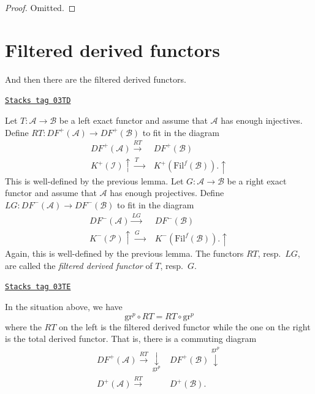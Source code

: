 \begin{proof}
Omitted.
\end{proof}

\section{Filtered derived functors}
\label{trace-section-filtered-derived-functors}
And then there are the filtered derived functors.

\begin{definition}
\label{trace-definition-filtered-derived-functors}
\href{https://stacks.math.columbia.edu/tag/03TD}{\texttt{Stacks tag 03TD}}

Let $T: \mathcal{A} \to \mathcal{B}$ be a left exact functor and assume that
$\mathcal{A}$ has enough injectives. Define $RT: DF^+(\mathcal{A}) \to D
F^+(\mathcal{B})$ to fit in the diagram
$$
\begin{array}{cc}DF^+(\mathcal{A}) \overset{RT}{\longrightarrow} & DF^+(\mathcal{B}) \\ K^+(\mathcal{I}) \uparrow\overset{T \quad}{\longrightarrow} & K^+(\text{Fil}^f(\mathcal{B})).
\uparrow\end{array}
$$
This is well-defined by the previous lemma. Let $G: \mathcal{A} \to
\mathcal{B}$ be a right exact functor and assume that $\mathcal{A}$ has enough
projectives. Define $LG: DF^-(\mathcal{A}) \to DF^-(\mathcal{B})$ to fit in
the diagram
$$
\begin{array}{cc}DF^-(\mathcal{A}) \overset{LG}{\longrightarrow} & DF^-(\mathcal{B}) \\ K^-(\mathcal{P}) \uparrow\overset{G \quad}{\longrightarrow} & K^-(\text{Fil}^f(\mathcal{B})).
\uparrow\end{array}
$$
Again, this is well-defined by the previous lemma.
The functors $RT$, resp.\ $LG$, are called the {\it filtered derived
functor} of $T$, resp.\ $G$.
\end{definition}

\begin{proposition}
\label{trace-proposition-compare-filtered-graded}
\href{https://stacks.math.columbia.edu/tag/03TE}{\texttt{Stacks tag 03TE}}

In the situation above, we have
$$
\text{gr}^p \circ RT = RT \circ \text{gr}^p
$$
where the $RT$ on the left is the filtered derived functor while the one on the
right is the total derived functor. That is, there is a commuting diagram
$$
\begin{array}{cc}DF^+(\mathcal{A}) \overset{RT}{\longrightarrow}\underset{\text{gr}^p}{\downarrow} & DF^+(\mathcal{B})
\overset{\text{gr}^p}{\downarrow} \\ D^+(\mathcal{A}) \overset{RT}{\longrightarrow} & D^+(\mathcal{B}).\end{array}
$$
\end{proposition}


